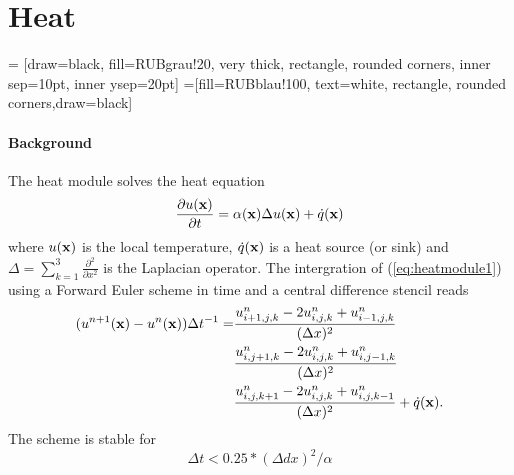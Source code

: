 \section{Heat}
\label{sec:module_heat}
 = [draw=black, fill=RUBgrau!20, very thick, rectangle, rounded corners, inner sep=10pt, inner ysep=20pt]
 =[fill=RUBblau!100, text=white, rectangle, rounded corners,draw=black]

\paragraph{Background}
The heat module solves the heat equation
\begin{equation}
  \frac{\partial u(\xB)}{\partial t} = \alpha(\xB) \Delta u(\xB) + \dot{q}(\xB)
\label{eq:heatmodule1}
\end{equation}
where $u(\mathbf{x})$ is the local temperature, $\dot{q}(\mathbf{x})$ is a heat source (or sink) and $\Delta = \sum_{k=1}^3\frac{\partial^ 2}{\partial x^2}$ is the Laplacian operator. The intergration of (\ref{eq:heatmodule1}) using a Forward Euler scheme in time and a central difference stencil reads
\begin{equation}
\begin{split}
  (u^{n+1}(\xB)-u^{n}(\xB))\Delta t^{-1} = 
  &\frac{u^n_{i+1,j,k}-2u^n_{i,j,k} + u^n_{i-1,j,k}}{(\Delta x)^2}\\
  &\frac{u^n_{i,j+1,k}-2u^n_{i,j,k} + u^n_{i,j-1,k}}{(\Delta x)^2} \\
  &\frac{u^n_{i,j,k+1}-2u^n_{i,j,k} + u^n_{i,j,k-1}}{(\Delta x)^2} + \dot{q}(\xB).
  \end{split}
\label{eq:heatmodule2}
\end{equation}
The scheme is stable for
\begin{equation}
   \Delta t < 0.25* (\Delta dx)^2/\alpha
\end{equation}

